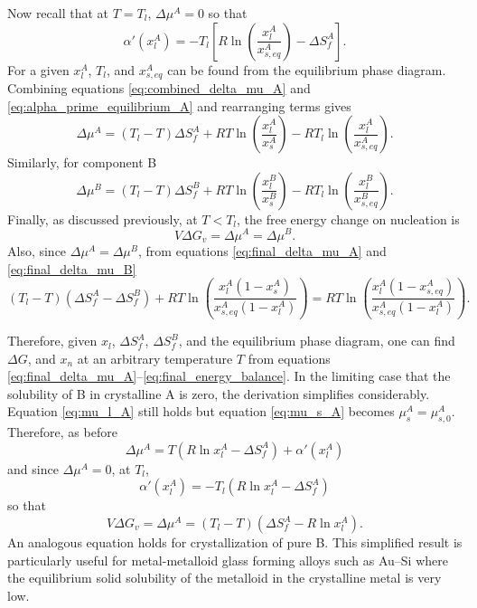 Now recall that at \(T = T_l\), \(\Delta \mu^A = 0\) so that
\begin{equation}
\alpha'(x_l^A) = -T_l \left[ R \ln\left(\frac{x_l^A}{x_{s,eq}^A}\right) - \Delta S_f^A \right]. \label{eq:alpha_prime_equilibrium_A}
\end{equation}
For a given \(x_l^A\), \(T_l\), and \(x_{s,eq}^A\) can be found from the equilibrium phase diagram. Combining equations \eqref{eq:combined_delta_mu_A} and \eqref{eq:alpha_prime_equilibrium_A} and rearranging terms gives
\begin{equation}
\Delta \mu^A = (T_l - T) \Delta S_f^A + RT \ln\left(\frac{x_l^A}{x_{s}^A}\right) - RT_l \ln\left(\frac{x_l^A}{x_{s,eq}^A}\right). \label{eq:final_delta_mu_A}
\end{equation}
Similarly, for component B
\begin{equation}
\Delta \mu^B = (T_l - T) \Delta S_f^B + RT \ln\left(\frac{x_l^B}{x_{s}^B}\right) - RT_l \ln\left(\frac{x_l^B}{x_{s,eq}^B}\right). \label{eq:final_delta_mu_B}
\end{equation}
Finally, as discussed previously, at \(T < T_l\), the free energy change on nucleation is
\begin{equation}
V \Delta G_v = \Delta \mu^A = \Delta \mu^B. \label{eq:free_energy_change_nucleation}
\end{equation}
Also, since \(\Delta \mu^A = \Delta \mu^B\), from equations \eqref{eq:final_delta_mu_A} and \eqref{eq:final_delta_mu_B}
\begin{equation}
(T_l - T)(\Delta S_f^A - \Delta S_f^B) + RT \ln\left(\frac{x_l^A(1 - x_{s}^A)}{x_{s,eq}^A(1 - x_l^A)}\right) = RT \ln\left(\frac{x_l^A(1 - x_{s,eq}^A)}{x_{s,eq}^A(1 - x_l^A)}\right). \label{eq:final_energy_balance}
\end{equation}

Therefore, given \(x_l\), \(\Delta S_f^A\), \(\Delta S_f^B\), and the equilibrium phase diagram, one can find \(\Delta G\), and \(x_n\) at an arbitrary temperature \(T\) from equations \eqref{eq:final_delta_mu_A}--\eqref{eq:final_energy_balance}. In the limiting case that the solubility of B in crystalline A is zero, the derivation simplifies considerably. Equation \eqref{eq:mu_l_A} still holds but equation \eqref{eq:mu_s_A} becomes \(\mu_s^A = \mu_{s,0}^A\). Therefore, as before
\begin{equation}
\Delta \mu^A = T(R \ln x_l^A - \Delta S_f^A) + \alpha'(x_l^A) \label{eq:simplified_delta_mu_A}
\end{equation}
and since \(\Delta \mu^A = 0\), at \(T_l\),
\begin{equation}
\alpha'(x_l^A) = -T_l(R \ln x_l^A - \Delta S_f^A) \label{eq:simplified_alpha_prime_A}
\end{equation}
so that
\begin{equation}
V \Delta G_v = \Delta \mu^A = (T_l - T)(\Delta S_f^A - R \ln x_l^A). \label{eq:simplified_free_energy_change}
\end{equation}
An analogous equation holds for crystallization of pure B. This simplified result is particularly useful for metal-metalloid glass forming alloys such as Au–Si where the equilibrium 
solid solubility of the metalloid in the crystalline metal is very low.

